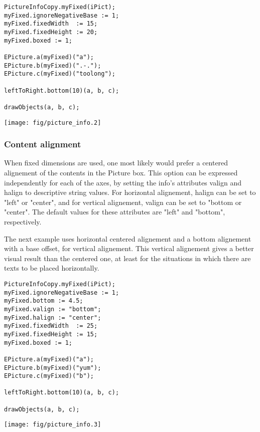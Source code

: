 \documentclass{article}
\newcommand{\code}{\ttfamily}
\begin{document}
\begin{multicols}{2}
\begin{verbatim}
PictureInfoCopy.myFixed(iPict);
myFixed.ignoreNegativeBase := 1;
myFixed.fixedWidth  := 15;
myFixed.fixedHeight := 20;
myFixed.boxed := 1;

EPicture.a(myFixed)("a");
EPicture.b(myFixed)(".-.");
EPicture.c(myFixed)("toolong");

leftToRight.bottom(10)(a, b, c);

drawObjects(a, b, c);
\end{verbatim}
\columnbreak
\hspace{1cm}\texttt{[image: fig/picture\_info.2]}
\end{multicols}

\subsubsection{Content alignment}

When fixed dimensions are used, one most likely would prefer a centered alignement of the contents in the 
{\code Picture} box. This option can be expressed independently for each of the axes, 
by setting the {\code info}'s attributes {\code valign} and {\code halign} to descriptive string values. 
For horizontal alignement, {\code halign} can be set to {\code "left"} or {\code "center"}, and for
vertical alignement, {\code valign} can be set to {\code "bottom} or {\code "center"}. The default
values for these attributes are {\code "left"} and {\code "bottom"}, respectively.

The next example uses horizontal centered alignement and a bottom alignement with a {\code 4.5} base offset, for
vertical alignement. This vertical alignement gives a better visual result than the centered one, at
least for the situations in which there are texts to be placed horizontally.

\begin{multicols}{2}
\begin{verbatim}
PictureInfoCopy.myFixed(iPict);
myFixed.ignoreNegativeBase := 1;
myFixed.bottom := 4.5;
myFixed.valign := "bottom";
myFixed.halign := "center";
myFixed.fixedWidth  := 25;
myFixed.fixedHeight := 15;
myFixed.boxed := 1;

EPicture.a(myFixed)("a");
EPicture.b(myFixed)("yum");
EPicture.c(myFixed)("b");

leftToRight.bottom(10)(a, b, c);

drawObjects(a, b, c);
\end{verbatim}
\columnbreak
\hspace{1cm}\texttt{[image: fig/picture\_info.3]}
\end{multicols}
\end{document}
